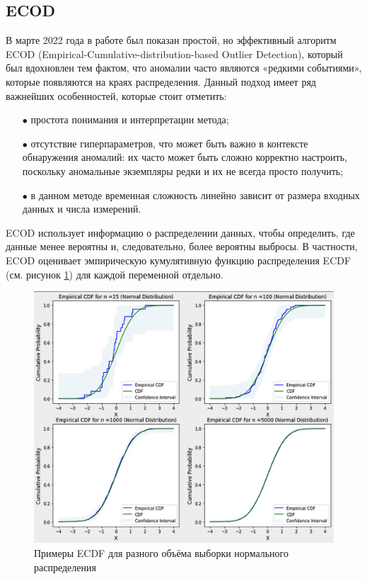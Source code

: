 \subsection{ECOD}

В марте 2022 года в работе \cite{ECOD} был показан простой, но эффективный алгоритм ECOD (Empirical-Cumulative-distribution-based Outlier Detection), который был вдохновлен тем фактом, что аномалии часто являются «редкими событиями», которые появляются на краях распределения. Данный подход имеет ряд важнейших особенностей, которые стоит отметить:

\begin{itemize}[leftmargin=0pt,itemindent=4.6em]
    \item[$\bullet$] простота понимания и интерпретации метода;
    \item[$\bullet$] отсутствие гиперпараметров, что может быть важно в контексте обнаружения аномалий: их часто может быть сложно корректно настроить, поскольку аномальные экземпляры редки и их не всегда просто получить;
    \item[$\bullet$] в данном методе временная сложность линейно зависит от размера входных данных и числа измерений.
\end{itemize}

ECOD использует информацию о распределении данных, чтобы определить, где данные менее вероятны и, следовательно, более вероятны выбросы. В частности, ECOD оценивает \cite{Replace-Outlier-Detection-with-ECOD} эмпирическую кумулятивную функцию распределения ECDF (см. рисунок \ref{fig:ecdf}) для каждой переменной отдельно.

\begin{figure}
  \centering
  \includegraphics[scale=0.3]{inc/images/ecdf.png}
  \caption{Примеры ECDF для разного объёма выборки нормального распределения \cite{Replace-Outlier-Detection-with-ECOD}}
  \label{fig:ecdf}
\end{figure}

